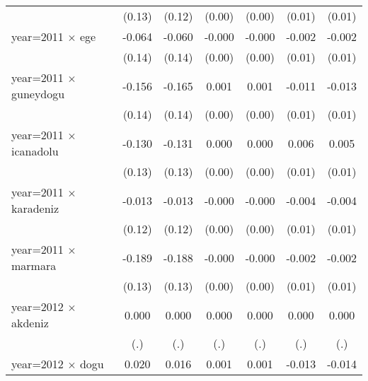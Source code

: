 {\begin{tabular}{l*{6}{c}}
                    &      (0.13)         &      (0.12)         &      (0.00)         &      (0.00)         &      (0.01)         &      (0.01)         \\
year=2011 $\times$ ege&      -0.064         &      -0.060         &      -0.000         &      -0.000         &      -0.002         &      -0.002         \\
                    &      (0.14)         &      (0.14)         &      (0.00)         &      (0.00)         &      (0.01)         &      (0.01)         \\
year=2011 $\times$ guneydogu&      -0.156         &      -0.165         &       0.001         &       0.001         &      -0.011         &      -0.013         \\
                    &      (0.14)         &      (0.14)         &      (0.00)         &      (0.00)         &      (0.01)         &      (0.01)         \\
year=2011 $\times$ icanadolu&      -0.130         &      -0.131         &       0.000         &       0.000         &       0.006         &       0.005         \\
                    &      (0.13)         &      (0.13)         &      (0.00)         &      (0.00)         &      (0.01)         &      (0.01)         \\
year=2011 $\times$ karadeniz&      -0.013         &      -0.013         &      -0.000         &      -0.000         &      -0.004         &      -0.004         \\
                    &      (0.12)         &      (0.12)         &      (0.00)         &      (0.00)         &      (0.01)         &      (0.01)         \\
year=2011 $\times$ marmara&      -0.189         &      -0.188         &      -0.000         &      -0.000         &      -0.002         &      -0.002         \\
                    &      (0.13)         &      (0.13)         &      (0.00)         &      (0.00)         &      (0.01)         &      (0.01)         \\
year=2012 $\times$ akdeniz&       0.000         &       0.000         &       0.000         &       0.000         &       0.000         &       0.000         \\
                    &         (.)         &         (.)         &         (.)         &         (.)         &         (.)         &         (.)         \\
year=2012 $\times$ dogu&       0.020         &       0.016         &       0.001         &       0.001         &      -0.013         &      -0.014         \\

\end{tabular}}
